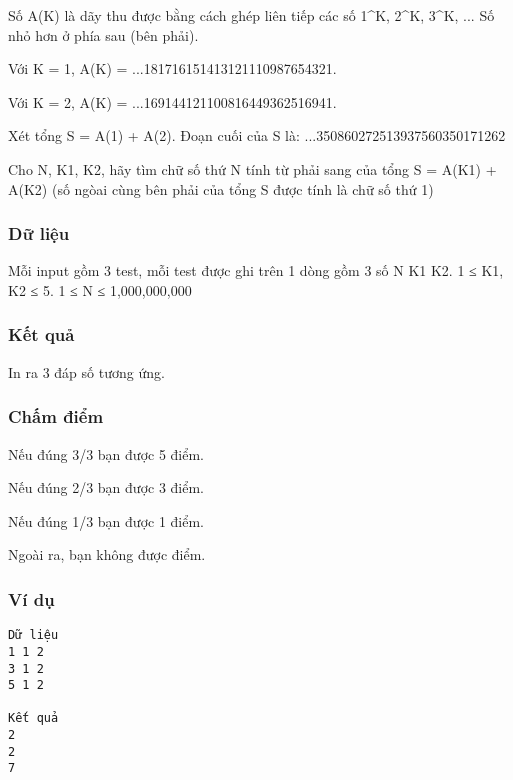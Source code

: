 

Số A(K) là dãy thu được bằng cách ghép liên tiếp các số 1^K, 2^K, 3^K, ... Số nhỏ hơn ở phía sau (bên phải).

Với K = 1, A(K) = ...181716151413121110987654321.

Với K = 2, A(K) = ...169144121100816449362516941.

Xét tổng S = A(1) + A(2). Đoạn cuối của S là: ...350860272513937560350171262

Cho N, K1, K2, hãy tìm chữ số thứ N tính từ phải sang của tổng S = A(K1) + A(K2) (số ngòai cùng bên phải của tổng S được tính là chữ số thứ 1)

\subsubsection{Dữ liệu}

Mỗi input gồm 3 test, mỗi test được ghi trên 1 dòng gồm 3 số N K1 K2. 1 ≤ K1, K2 ≤ 5. 1 ≤ N ≤ 1,000,000,000

\subsubsection{Kết quả}

In ra 3 đáp số tương ứng.

\subsubsection{Chấm điểm}

Nếu đúng 3/3 bạn được 5 điểm.

Nếu đúng 2/3 bạn được 3 điểm.

Nếu đúng 1/3 bạn được 1 điểm.

Ngoài ra, bạn không được điểm.

\subsubsection{Ví dụ}
\begin{verbatim}
Dữ liệu
1 1 2
3 1 2
5 1 2

Kết quả
2
2
7
\end{verbatim}
